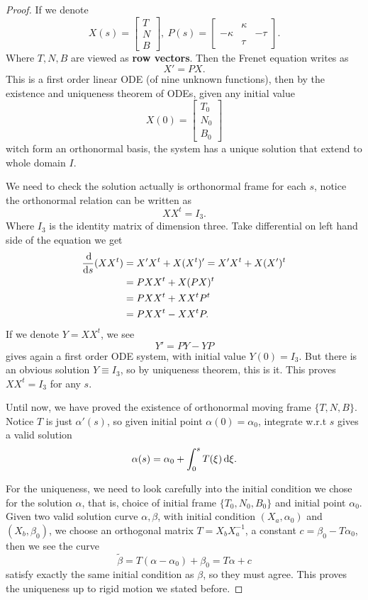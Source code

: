 \begin{proof}
    If we denote \[
        X(s)=\begin{bmatrix}
            T \\ N \\ B
        \end{bmatrix},\ 
        P(s)=\begin{bmatrix}
            & \kappa & \\
            -\kappa & & -\tau \\
            & \tau & 
        \end{bmatrix}
    .\] Where \(T,N,B\) are viewed as \textbf{row vectors}. Then the Frenet equation
    writes as \[
        X'=PX
    .\] This is a first order linear ODE (of nine unknown functions), then by the
    existence and uniqueness theorem of ODEs, given any initial value \[
        X(0)=\begin{bmatrix}
            T_0 \\ N_0 \\ B_0
        \end{bmatrix}
    \] witch form an orthonormal basis, the system has a unique solution that extend
    to whole domain \(I\).

    We need to check the solution actually is orthonormal frame for each \(s\),
    notice the orthonormal relation can be written as \[
        XX^t=I_3
    .\] Where \(I_3\) is the identity matrix of dimension three. Take differential
    on left hand side of the equation we get
    \begin{align*}
        \frac{\dif}{\dif s}(XX^t)&= X'X^t+X(X^t)'=X'X^t+X(X')^t \\
        &= PXX^t+X(PX)^t \\
        &= PXX^t+XX^t P^t \\
        &= PXX^t-XX^t P
    .\end{align*}
    If we denote \(Y=XX^t\), we see \[
        Y'=PY-YP
    \] gives again a first order ODE system, with initial value \(Y(0)=I_3\). But
    there is an obvious solution \(Y\equiv I_3\), so by uniqueness theorem, this
    is it. This proves \(XX^t=I_3\) for any \(s\).

    Until now, we have proved the existence of orthonormal moving frame
    \(\{T,N,B\}\). Notice \(T\) is just \(\alpha'(s)\), so given initial point
    \(\alpha(0)=\alpha_0\), integrate w.r.t \(s\) gives a valid solution \[
        \alpha(s)=\alpha_0+\int_{0}^{s}T(\xi)\dif \xi
    .\]

    For the uniqueness, we need to look carefully into the initial condition we
    chose for the solution \(\alpha\), that is, choice of initial frame
    \(\{T_0,N_0,B_0\}\) and initial point \(\alpha_0\). Given two valid solution
    curve \(\alpha,\beta\), with initial condition \((X_a,\alpha_0)\) and \((X_b,
    \beta_0)\), we choose an orthogonal matrix \(T=X_b X_a^{-1}\), a constant
    \(c=\beta_0-T\alpha_0\), then we see the curve \[
        \tilde{\beta}=T(\alpha-\alpha_0)+\beta_0=T\alpha+c
    \] satisfy exactly the same initial condition as \(\beta\), so they must agree.
    This proves the uniqueness up to rigid motion we stated before.
\end{proof}

